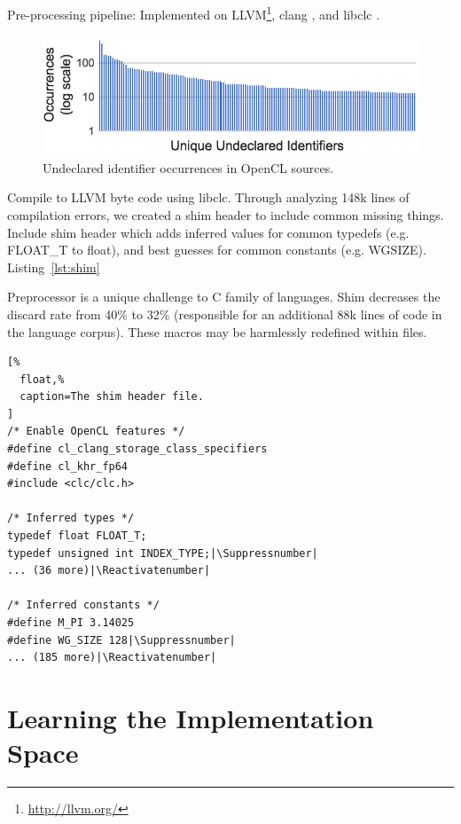 \documentclass[preprint,nonatbib,10pt,nocopyrightspace]{sigplanconf}
\makeatletter
\let\origthelstnumber\thelstnumber
\newcommand*\Suppressnumber{%
  \lst@AddToHook{OnNewLine}{%
    \let\thelstnumber\relax%
     \advance\c@lstnumber-\@ne\relax%
    }%
}
\newcommand*\Reactivatenumber{%
  \lst@AddToHook{OnNewLine}{%
   \let\thelstnumber\origthelstnumber%
   \advance\c@lstnumber\@ne\relax}%
}
\makeatother
\begin{document}
Pre-processing pipeline: Implemented on
LLVM\footnote{\url{http://llvm.org/}},
clang%
, and libclc%
.

\begin{figure}%
\includegraphics[width=\columnwidth]{img/undeclared-identifiers.png}
\caption{%
  Undeclared identifier occurrences in OpenCL sources.
}
\end{figure}

Compile to LLVM byte code using libclc. Through analyzing 148k lines of
compilation errors, we created a shim header to include common missing
things. Include shim header which adds inferred values for common
typedefs (e.g. FLOAT\_T to float), and best guesses for common
constants (e.g. WGSIZE). Listing~\ref{lst:shim}

Preprocessor is a unique challenge to C family of languages. Shim
decreases the discard rate from 40\% to 32\% (responsible for an
additional 88k lines of code in the language corpus). These macros may
be harmlessly redefined within files.

\lstset{language=C}
\begin{lstlisting}[%
  float,%
  caption=The shim header file.
]
/* Enable OpenCL features */
#define cl_clang_storage_class_specifiers
#define cl_khr_fp64
#include <clc/clc.h>

/* Inferred types */
typedef float FLOAT_T;
typedef unsigned int INDEX_TYPE;|\Suppressnumber|
... (36 more)|\Reactivatenumber|

/* Inferred constants */
#define M_PI 3.14025
#define WG_SIZE 128|\Suppressnumber|
... (185 more)|\Reactivatenumber|
\end{lstlisting}

\section{Learning the Implementation Space}\label{sec:ml}
\end{document}
